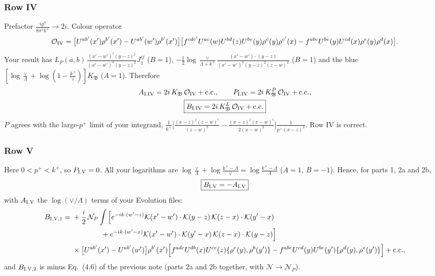\documentclass[10pt]{article}
\numberwithin{equation}{section}
\newcommand{\KK}{\mathcal K}
\newcommand{\NN}{\mathcal N}
\newcommand{\NP}{\mathcal N_{P}}
\newcommand{\kp}{k^+}
\newcommand{\pp}{p^+}
\begin{document}
\subsubsection{Row IV}
Prefactor $\frac{ig^4}{8\pi^5k^+}\to2i$. Colour operator
\[
\mathcal O_{\rm IV}=\big[U^{ab'}(x')\rho^{b'}(x')-U^{ab'}(w')\rho^{b'}(x')\big]\big[f^{cdc'}U^{ac}(w)U^{bd}(z)U^{be}(y)\rho^e(y)\rho^{c'}(x)-f^{abc}U^{be}(y)U^{cd}(x)\rho^e(y)\rho^d(x)\big].
\]
Your result has $L_P(a,b)\,\frac{(x'-w')^i(y-z)^j}{(x'-w')^2(y-z)^2}J_1^{ij}$ ($B=1$), $-\frac12\log\frac{\vee}{\Lambda+k^+}\frac{(x'-w')\cdot(y-z)}{(x'-w')^2(y-z)^2(z-w)^2}$ ($B=1$) and the blue $[\log\frac{\vee}{\Lambda}+\log(1-\frac{k^+}{\vee})]K_{\mathfrak B}$ ($A=1$). Therefore
\begin{gather}
A_{\rm I.IV}=2i\,K_{\mathfrak B}\,\mathcal O_{\rm IV}+{\rm c.c.},\qquad P_{\rm I.IV}=2i\,K^{P}_{\mathfrak B}\,\mathcal O_{\rm IV}+{\rm c.c.},\notag\\
\boxed{B_{\rm I.IV}=2i\,K^{L}_{\mathfrak B}\,\mathcal O_{\rm IV}+{\rm c.c.}}
\end{gather}
$P$ agrees with the large-$\pp$ limit of your integrand, $\frac{1}{k^+}\big[\frac{(x-z)^j(z-w)^i}{(z-w)^2}-\frac{(x-z)^j(x-w)^i}{2(x-w)^2}\big]\frac{1}{\pp(x-z)^2}$. Row IV is correct.

\subsubsection{Row V}
Here $0<\pp<\kp$, so $P_{\rm I.V}=0$. All your logarithms are $\log\frac{\vee}{\Lambda}+\log\frac{k^+-\Lambda}{\vee}=\log\frac{k^+-\Lambda}{\Lambda}$ ($A=1$, $B=-1$). Hence, for parts 1, 2a and 2b,
\begin{equation}
\boxed{B_{\rm I.V}=-A_{\rm I.V}}
\end{equation}
with $A_{\rm I.V}$ the $\log(\vee/\Lambda)$ terms of your Evolution files:
\begin{align}
B_{\rm I.V,1}={}&+\frac i2\,\NP\int\Big[e^{-ik\cdot(w'-z)}\KK(x'-w')\cdot\KK(y-z)\,\KK(z-x)\cdot\KK(y'-x)\notag\\
&\qquad\qquad+e^{-ik\cdot(w'-x)}\KK(x'-w')\cdot\KK(y'-x)\,\KK(z-x)\cdot\KK(y-z)\Big]\notag\\
&\times\big[U^{ab'}(x')-U^{ab'}(w')\big]\rho^{b'}(x')\Big[f^{adc}U^{db}(x)U^{ce}(z)\{\rho^e(y),\rho^b(y')\}-f^{abc}U^{cd}(y)U^{be}(y')\{\rho^d(y),\rho^e(y')\}\Big]+{\rm c.c.},
\end{align}
and $B_{\rm I.V,2}$ is minus Eq.~(4.6) of the previous note (parts 2a and 2b together, with $\NN\to\NP$).
\end{document}

